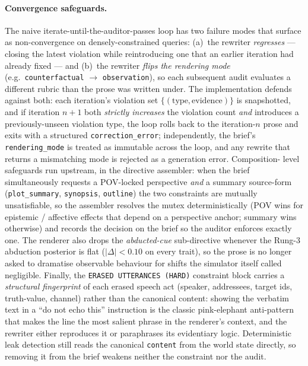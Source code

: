 \documentclass[11pt]{article}
\begin{document}
\paragraph{Convergence safeguards.} The naive iterate-until-the-auditor-passes
loop has two failure modes that surface as non-convergence on
densely-constrained queries: (a)~the rewriter \emph{regresses} ---
closing the latest violation while reintroducing one that an
earlier iteration had already fixed --- and (b)~the rewriter
\emph{flips the rendering mode} (e.g.\ \texttt{counterfactual}
$\rightarrow$ \texttt{observation}), so each subsequent audit
evaluates a different rubric than the prose was written under.
The implementation defends against both: each iteration's
violation set $\{(\text{type},\text{evidence})\}$ is snapshotted,
and if iteration $n{+}1$ both \emph{strictly increases} the
violation count \emph{and} introduces a previously-unseen
violation type, the loop rolls back to the iteration-$n$ prose
and exits with a structured \texttt{correction\_error};
independently, the brief's \texttt{rendering\_mode} is treated as
immutable across the loop, and any rewrite that returns a
mismatching mode is rejected as a generation error. Composition-
level safeguards run upstream, in the directive assembler:
when the brief simultaneously requests a POV-locked perspective
\emph{and} a summary source-form (\texttt{plot\_summary},
\texttt{synopsis}, \texttt{outline}) the two constraints are
mutually unsatisfiable, so the assembler resolves the mutex
deterministically (POV wins for epistemic / affective effects
that depend on a perspective anchor; summary wins otherwise) and
records the decision on the brief so the auditor enforces
exactly one. The renderer also drops the \emph{abducted-cue}
sub-directive whenever the Rung-3 abduction posterior is flat
($|\Delta| < 0.10$ on every trait), so the prose is no longer
asked to dramatise observable behaviour for shifts the simulator
itself called negligible. Finally, the
\texttt{ERASED~UTTERANCES~(HARD)} constraint block carries a
\emph{structural fingerprint} of each erased speech act
(speaker, addressees, target ids, truth-value, channel) rather
than the canonical content: showing the verbatim text in a ``do
not echo this'' instruction is the classic pink-elephant
anti-pattern that makes the line the most salient phrase in the
renderer's context, and the rewriter either reproduces it or
paraphrases its evidentiary logic. Deterministic leak detection
still reads the canonical \texttt{content} from the world state
directly, so removing it from the brief weakens neither the
constraint nor the audit.
\end{document}
